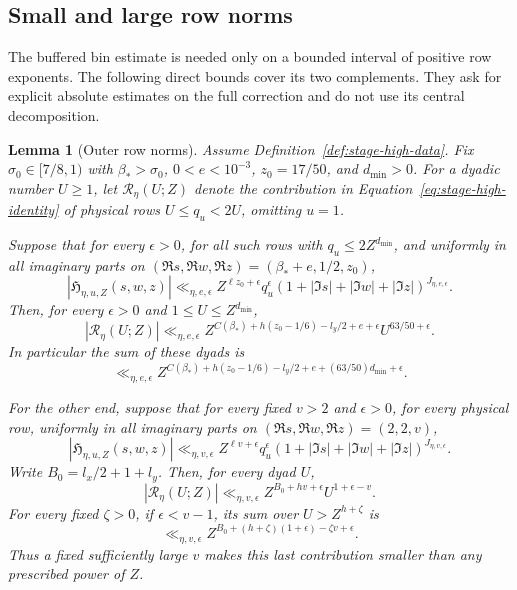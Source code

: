\documentclass[11pt,a4paper]{article}
\numberwithin{equation}{section}
\numberwithin{figure}{section}
\newtheorem{lemma}[theorem]{Lemma}
\theoremstyle{definition}
\theoremstyle{remark}
\begin{document}
\subsection{Small and large row norms}

The buffered bin estimate is needed only on a bounded interval of positive
row exponents.  The following direct bounds cover its two complements.
They ask for explicit absolute estimates on the full correction and do not
use its central decomposition.

\begin{lemma}[Outer row norms]
\label{lem:outer-row-tails}
Assume Definition~\ref{def:stage-high-data}.  Fix
$\sigma_0\in[7/8,1)$ with $\beta_*>\sigma_0$, $0<e<10^{-3}$,
$z_0=17/50$, and $d_{\min}>0$.  For a dyadic number $U\ge1$, let
$\mathscr R_\eta(U;Z)$ denote the contribution in
Equation~\eqref{eq:stage-high-identity} of physical rows
$U\le q_u<2U$, omitting $u=1$.

Suppose that for every $\epsilon>0$, for all such rows with
$q_u\le2Z^{d_{\min}}$, and uniformly in all imaginary parts on
$(\Re s,\Re w,\Re z)=(\beta_*+e,1/2,z_0)$,
\begin{equation}
 |\mathfrak H_{\eta,u,Z}(s,w,z)|
 \ll_{\eta,e,\epsilon}
 Z^{\ell z_0+\epsilon}q_u^\epsilon
 (1+|\Im s|+|\Im w|+|\Im z|)^{J_{\eta,e,\epsilon}}.
 \label{eq:small-correction-bound}
\end{equation}
Then, for every $\epsilon>0$ and $1\le U\le Z^{d_{\min}}$,
\begin{equation}
 |\mathscr R_\eta(U;Z)|
 \ll_{\eta,e,\epsilon}
 Z^{C(\beta_*)+h(z_0-1/6)-l_y/2+e+\epsilon}
       U^{63/50+\epsilon}.
 \label{eq:small-row-bound}
\end{equation}
In particular the sum of these dyads is
\begin{equation}
 \ll_{\eta,e,\epsilon}
 Z^{C(\beta_*)+h(z_0-1/6)-l_y/2+e+(63/50)d_{\min}+\epsilon}.
 \label{eq:small-row-sum}
\end{equation}

For the other end, suppose that for every fixed $v>2$ and $\epsilon>0$,
for every physical row, uniformly in all imaginary parts on
$(\Re s,\Re w,\Re z)=(2,2,v)$,
\begin{equation}
 |\mathfrak H_{\eta,u,Z}(s,w,z)|
 \ll_{\eta,v,\epsilon}
 Z^{\ell v+\epsilon}q_u^\epsilon
 (1+|\Im s|+|\Im w|+|\Im z|)^{J_{\eta,v,\epsilon}}.
 \label{eq:large-correction-bound}
\end{equation}
Write $B_0=l_x/2+1+l_y$.  Then, for every dyad $U$,
\begin{equation}
 |\mathscr R_\eta(U;Z)|
 \ll_{\eta,v,\epsilon}Z^{B_0+hv+\epsilon}U^{1+\epsilon-v}.
 \label{eq:large-row-bound}
\end{equation}
For every fixed $\zeta>0$, if $\epsilon<v-1$, its sum over
$U>Z^{h+\zeta}$ is
\begin{equation}
 \ll_{\eta,v,\epsilon}
 Z^{B_0+(h+\zeta)(1+\epsilon)-\zeta v+\epsilon}.
 \label{eq:large-row-sum}
\end{equation}
Thus a fixed sufficiently large $v$ makes this last contribution smaller
than any prescribed power of $Z$.
\end{lemma}
\end{document}
